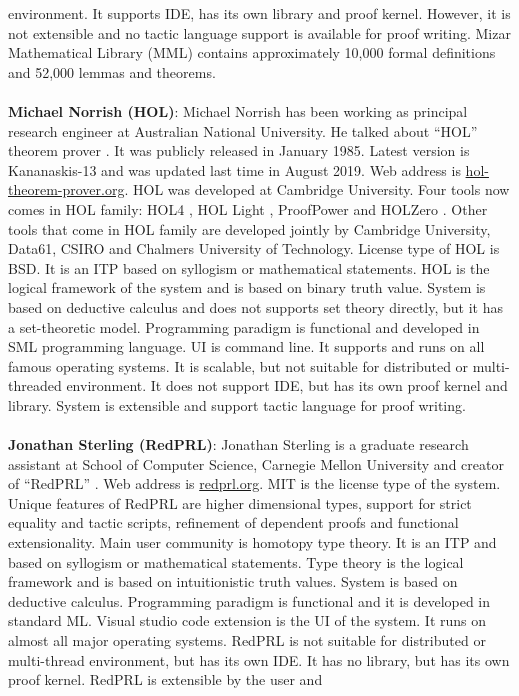 environment. It supports IDE, has its own library and proof kernel. However, it is not extensible and no tactic 
language support is available for proof writing. Mizar Mathematical Library (MML) contains approximately 10,000 formal definitions 
and 52,000 lemmas and theorems.
\\\\
{\bf Michael Norrish (HOL)}: 
Michael Norrish has been working as principal research engineer at Australian National University. He talked about ``HOL'' theorem prover 
. It was publicly released in January 1985. Latest version is Kananaskis-13 and was updated last time in August 2019. 
Web address is \url{hol-theorem-prover.org}. HOL was developed at Cambridge University. 
Four tools now comes in HOL family: HOL4 , HOL Light , ProofPower  and HOLZero . 
Other tools that come in HOL family are developed jointly by Cambridge University, 
Data61, CSIRO and Chalmers University of Technology. License type of HOL is BSD. It is an ITP based on syllogism 
or mathematical statements. HOL is the logical framework of the system and is based on binary truth value. 
System is based on deductive calculus and does not supports set theory directly, but it has a set-theoretic model. 
Programming paradigm is functional and developed in SML programming language. UI is command line. 
It supports and runs on all famous operating systems. It is scalable, but not suitable for distributed or multi-threaded environment. 
It does not support IDE, but has its own proof kernel and library. System is extensible and support tactic language for proof writing.
\\\\
{\bf Jonathan Sterling (RedPRL)}:
Jonathan Sterling is a graduate research assistant at School of Computer Science, Carnegie Mellon University and creator of 
``RedPRL'' . Web address is \url{redprl.org}. 
MIT is the license type of the system. Unique features of RedPRL are higher dimensional types, support for strict equality and tactic scripts, 
refinement of dependent proofs and functional extensionality.
Main user community is homotopy type theory. 
It is an ITP and based on syllogism or mathematical statements. Type theory is the logical framework and is based 
on intuitionistic truth values. System is based on deductive calculus. Programming paradigm is functional and it is 
developed in standard ML. Visual studio code extension is the UI of the system. 
It runs on almost all major operating systems. RedPRL is not suitable for distributed or multi-thread environment, 
but has its own IDE. It has no library, but has its own proof kernel. RedPRL is extensible by the user and 
